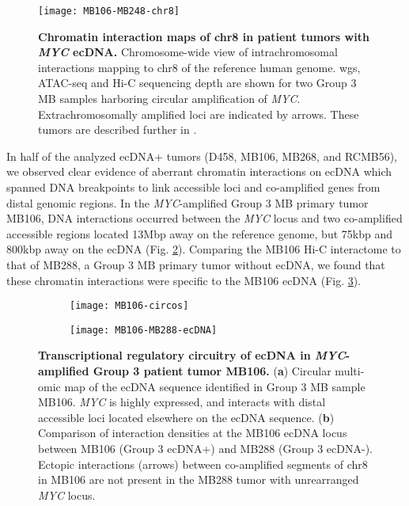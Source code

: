 \begin{figure}[!h]
    \centering
    \texttt{[image: MB106-MB248-chr8]}
    \label{fig:MB106-MB248-hic}
    \caption[Chromatin interaction maps of chr8 in patient tumors with \textit{MYC} ecDNA.]{\textbf{Chromatin interaction maps of chr8 in patient tumors with \textit{MYC} ecDNA.} Chromosome-wide view of intrachromosomal interactions mapping to chr8 of the reference human genome. \Gls{wgs}, ATAC-seq and Hi-C sequencing depth are shown for two Group 3 MB samples harboring circular amplification of \textit{MYC}. Extrachromosomally amplified loci are indicated by arrows. These tumors are described further in \cite{archer_2017}.
    }
    \label{fig:mb106-mb248-myc-hic}
\end{figure}

\par In half of the analyzed ecDNA+ tumors (D458, MB106, MB268, and RCMB56), we observed clear evidence of aberrant chromatin interactions on ecDNA which spanned DNA breakpoints to link accessible loci and co-amplified genes from distal genomic regions. In the \textit{MYC}-amplified Group 3 MB primary tumor MB106, DNA interactions occurred between the \textit{MYC} locus and two co-amplified accessible regions located 13Mbp away on the reference genome, but 75kbp and 800kbp away on the ecDNA (Fig. \ref{subfig:MB106-circos}). Comparing the MB106 Hi-C interactome to that of MB288, a Group 3 MB primary tumor without ecDNA, we found that these chromatin interactions were specific to the MB106 ecDNA (Fig. \ref{subfig:MB106-MB288-hic}). 

\begin{figure}[!h]
    \begin{subfigure}{.49\textwidth}
        \centering
        \texttt{[image: MB106-circos]}
        \caption{}
        \label{subfig:MB106-circos}
    \end{subfigure}
    \begin{subfigure}{.49\textwidth}
        \centering
        \texttt{[image: MB106-MB288-ecDNA]}
        \caption{}
        \label{subfig:MB106-MB288-hic}
    \end{subfigure}
    \caption[Transcriptional regulatory circuitry of ecDNA in \textit{MYC}-amplified Group 3 patient tumor MB106.]{\textbf{Transcriptional regulatory circuitry of ecDNA in \textit{MYC}-amplified Group 3 patient tumor MB106.} (\textbf{a}) Circular multi-omic map of the ecDNA sequence identified in Group 3 MB sample MB106. \textit{MYC} is highly expressed, and interacts with distal accessible loci located elsewhere on the ecDNA sequence. (\textbf{b}) Comparison of interaction densities at the MB106 ecDNA locus between MB106 (Group 3 ecDNA+) and MB288 (Group 3 ecDNA-). Ectopic interactions (arrows) between co-amplified segments of chr8 in MB106 are not present in the MB288 tumor with unrearranged \textit{MYC} locus.
    }
    \label{fig:MB106-MB288-myc-hic}
\end{figure}

